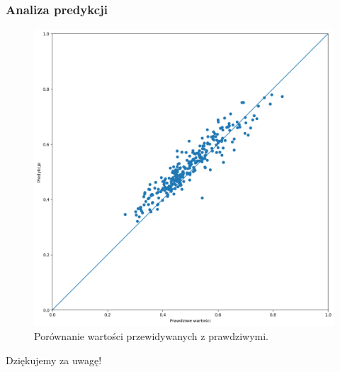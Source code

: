 \documentclass[]{beamer}
\begin{document}
\begin{frame}
  \frametitle{Analiza predykcji}

  \begin{figure}
    \centering
      \includegraphics[width=0.6\linewidth]{analiza_jakas_dziwna.png}
    \caption{
      Porównanie wartości przewidywanych z prawdziwymi.
    }
  \end{figure}

\end{frame}




\begin{frame}
  \centering
  \huge{
    Dziękujemy za uwagę!}
\end{frame}
\end{document}
